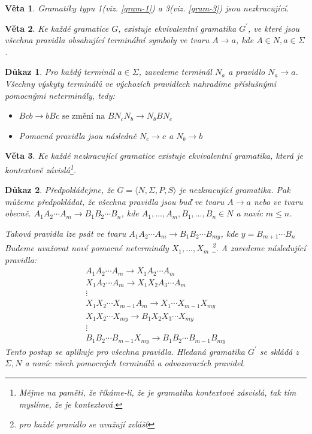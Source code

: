 \documentclass[10pt, a4paper, titlepage]{article}
\theoremstyle{note}
\newtheorem{veta}{\textbf{Věta}}
\newtheorem{dukaz}{\textbf{Důkaz}}
\begin{document}
\begin{veta}
Gramatiky typu 1(viz. \ref{gram-1}) a 3(viz. \ref{gram-3}) jsou nezkracující.
\end{veta}

\begin{veta}
Ke každé gramatice $G$, existuje ekvivalentní gramatika $G^{'}$, ve které
jsou všechna pravidla obsahující terminální symboly ve tvaru $A \rightarrow a$, kde $A \in N, a \in \Sigma$.
\end{veta}

\begin{dukaz}
Pro každý terminál $a \in \Sigma$, zavedeme terminál $N_{a}$ a pravidlo $N_{a} \rightarrow a$.
Všechny výskyty terminálů ve výchozích pravidlech nahradíme příslušnými pomocnými neterminály, tedy:
\begin{itemize}
\item
$Bcb \rightarrow bBc \text{ se změní na } BN_{c}N_{b} \rightarrow N_{b} BN_{c}$

\item
Pomocná pravidla jsou následně $N_{c} \rightarrow c$ a $N_{b} \rightarrow b$
\end{itemize}
\end{dukaz}

\begin{veta}
Ke každé nezkracující gramatice existuje ekvivalentní gramatika, která je kontextově závislá\footnote{Mějme na paměti, že říkáme-li, že je
gramatika kontextové zásvislá, tak tím myslíme, že je kontextová.}.
\end{veta}

\begin{dukaz}
Předpokládejme, že $G = \langle N, \Sigma, P, S \rangle$ je nezkracující gramatika. Pak můžeme předpokládat, 
že všechna pravidla jsou buď ve tvaru $A \rightarrow a$ nebo ve tvaru obecně. 
$A_{1} A_{2} \cdots A_{m} \rightarrow B_{1} B_{2} \cdots B_{n}$, kde $A_{1}, \ldots,A_{m}, B_{1}, \ldots,B_{n} \in N$ a navíc $m \leq n$. 

Taková pravidla lze psát ve tvaru $A_{1} A_{2} \cdots A_{m} \rightarrow B_{1} B_{2} \cdots B_{my}$, kde $y = B_{m+1} \cdots B_{n}$ 
Budeme uvažovat nové pomocné neterminály $X_{1},...,X_{m}$ \footnote{pro každé pravidlo se uvažují zvlášť}. 
A zavedeme následující pravidla:
\begin{gather*}
A_{1} A_{2} \cdots A_{m} \rightarrow X_{1} A_{2} \cdots A_{m} \\
X_{1} A_{2} \cdots A_{m} \rightarrow X_{1} X_{2} A_{3} \cdots A_{m} \\
\vdots \\
X_{1} X_{2} \cdots X_{m-1} A_{m} \rightarrow X_{1} \cdots X_{m-1} X_{my} \\
X_{1} X_{2} \cdots X_{my} \rightarrow B_{1} X_{2} X_{3} \cdots X_{my} \\
\vdots \\
B_{1} B_{2} \cdots B_{m-1} X_{my} \rightarrow B_{1} B_{2} \cdots B_{m-1}B_{my}
\end{gather*}
Tento postup se aplikuje pro všechna pravidla. Hledaná gramatika $G^{'}$ se skládá
z $\Sigma, N$ a navíc všech pomocných terminálů a odvozovacích pravidel.
\end{dukaz}
\end{document}
